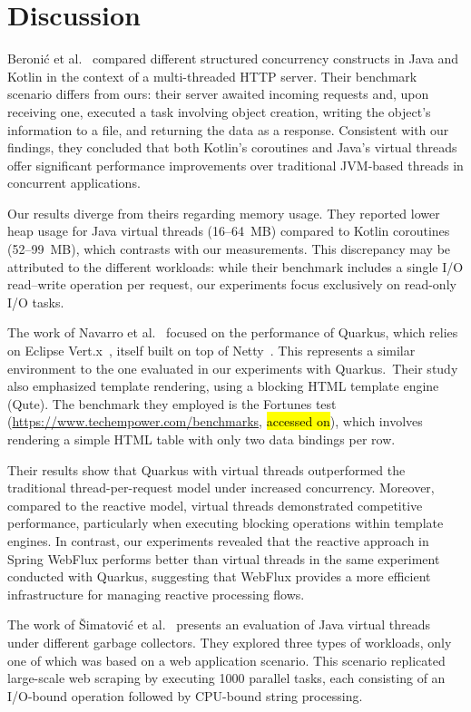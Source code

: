\documentclass[software,article,accept,pdftex,moreauthors]{Definitions/mdpi}
\begin{document}
\section{{Discussion} 
}\label{s6}

Beronić et al.~\cite{9803765} compared different structured concurrency
constructs in Java and Kotlin in the context of a multi-threaded HTTP server.
Their benchmark scenario differs from ours: their server awaited incoming
requests and, upon receiving one, executed a task involving object creation,
writing the object's information to a file, and returning the data as a
response. Consistent with our findings, they concluded that both Kotlin's
coroutines and Java's virtual threads offer significant performance
improvements over traditional JVM-based threads in concurrent applications.

Our results diverge from theirs regarding memory usage. They reported lower
heap usage for Java virtual threads (16–64~MB) compared to Kotlin coroutines
(52–99~MB), which contrasts with our measurements. This discrepancy may be
attributed to the different workloads: while their benchmark includes a single
I/O read--write operation per request, our experiments focus exclusively on
read-only I/O tasks.

The work of Navarro et al.~\cite{navarro2023considerations} focused on the
performance of Quarkus, which relies on Eclipse Vert.x~\cite{vertx}, itself
built on top of Netty~\cite{netty}. This represents a similar environment to
the one evaluated in our experiments with Quarkus.~Their study also emphasized
template rendering, using a blocking HTML template engine (Qute). The benchmark
they employed is the Fortunes
test ({\url{https://www.techempower.com/benchmarks}}, \hl{accessed on}), which involves
rendering a simple HTML table with only two data bindings per row.

Their results show that Quarkus with virtual threads outperformed the
traditional thread-per-request model under increased concurrency. Moreover,
compared to the reactive model, virtual threads demonstrated competitive
performance, particularly when executing blocking operations within template
engines.
In contrast, our experiments revealed that the reactive approach in Spring
WebFlux performs better than virtual threads in the same experiment conducted
with Quarkus, suggesting that WebFlux provides a more efficient infrastructure
for managing reactive processing flows.

The work of Šimatović et al.~\cite{vsimatovic2025evaluating} presents an
evaluation of Java virtual threads under different garbage collectors. They
explored three types of workloads, only one of which was based on a web
application scenario. This scenario replicated large-scale web scraping by
executing 1000 parallel tasks, each consisting of an I/O-bound operation
followed by CPU-bound string processing.
\end{document}
